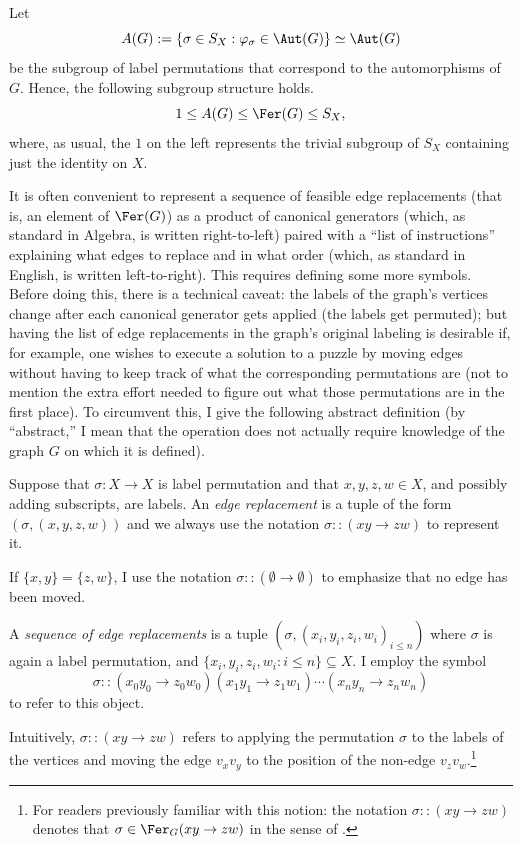 Let $$A(G):=\{\sigma\in S_X:\varphi_\sigma\in\Aut(G)\}\simeq\Aut(G)$$ be the subgroup of label permutations that correspond to the automorphisms of $G$.
Hence, the following subgroup structure holds.
$$1\leq A(G)\leq\Fer(G)\leq S_X,$$ where, as usual, the $1$ on the left represents the trivial subgroup of $S_X$ containing just the identity on $X$.

It is often convenient to represent a sequence of feasible edge replacements (that is, an element of $\Fer(G)$) as a product of canonical generators (which, as standard in Algebra, is written right-to-left) paired with a ``list of instructions'' explaining what edges to replace and in what order (which, as standard in English, is written left-to-right).
This requires defining some more symbols.
Before doing this, there is a technical caveat: the labels of the graph's vertices change after each canonical generator gets applied (the labels get permuted); but having the list of edge replacements in the graph's original labeling is desirable if, for example, one wishes to execute a solution to a puzzle by moving edges without having to keep track of what the corresponding permutations are (not to mention the extra effort needed to figure out what those permutations are in the first place).
To circumvent this, I give the following abstract definition (by ``abstract,'' I mean that the operation does not actually require knowledge of the graph $G$ on which it is defined).

\begin{definition}\label{def:fer-object}
    Suppose that $\sigma\colon X\to X$ is label permutation and that $x,y,z,w\in X$, and possibly adding subscripts, are labels.
    An \emph{edge replacement} is a tuple of the form $(\sigma, (x, y, z, w))$ and we always use the notation $\sigma::(xy\to zw)$ to represent it.

    If $\{x,y\}=\{z,w\}$, I use the notation $\sigma::(\emptyset\to\emptyset)$ to emphasize that no edge has been moved.

    A \emph{sequence of edge replacements} is a tuple $(\sigma,(x_i,y_i,z_i,w_i)_{i\leq n})$ where $\sigma$ is again a label permutation, and $\{x_i,y_i,z_i,w_i:i\leq n\}\subseteq X$.
    I employ the symbol $$\sigma::(x_0y_0\to z_0w_0)(x_1y_1\to z_1w_1)\cdots(x_ny_n\to z_nw_n)$$ to refer to this object.
\end{definition}

Intuitively, $\sigma::(xy\to zw)$ refers to applying the permutation $\sigma$ to the labels of the vertices and moving the edge $v_xv_y$ to the position of the non-edge $v_zv_w$.\footnote{For readers previously familiar with this notion: the notation $\sigma::(xy\to zw)$ denotes that $\sigma\in\Fer_G(xy\to zw)$ in the sense of \cite{Caro2020GraphsIU}.}

